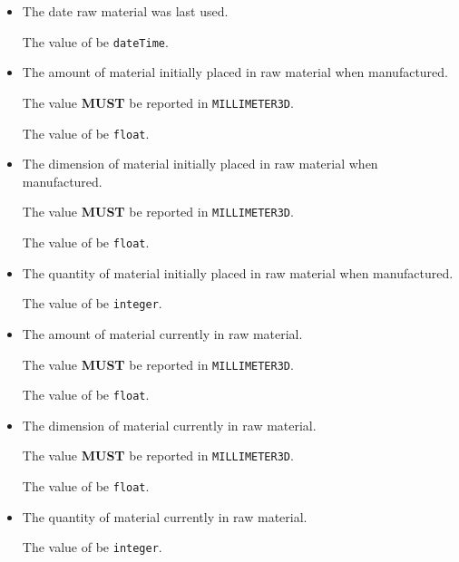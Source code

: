 \begin{itemize}
\item {} \newline The date \gls{raw material} was last used.

The value of  \MUST be \texttt{dateTime}.

\item {} \newline The amount of material initially placed in \gls{raw material} when manufactured.

The value \textbf{MUST} be reported in \texttt{MILLIMETER\textunderscore 3D}.

The value of  \MUST be \texttt{float}.

\item {} \newline The dimension of material initially placed in \gls{raw material} when manufactured.

The value \textbf{MUST} be reported in \texttt{MILLIMETER\textunderscore 3D}.

The value of  \MUST be \texttt{float}.

\item {} \newline The quantity of material initially placed in \gls{raw material} when manufactured.

The value of  \MUST be \texttt{integer}.

\item {} \newline  The amount of material currently in \gls{raw material}.

The value \textbf{MUST} be reported in \texttt{MILLIMETER\textunderscore 3D}.

The value of  \MUST be \texttt{float}.

\item {} \newline The dimension of material currently in \gls{raw material}.

The value \textbf{MUST} be reported in \texttt{MILLIMETER\textunderscore 3D}.

The value of  \MUST be \texttt{float}.

\item {} \newline The quantity of material currently in \gls{raw material}.

The value of  \MUST be \texttt{integer}.
\end{itemize}



